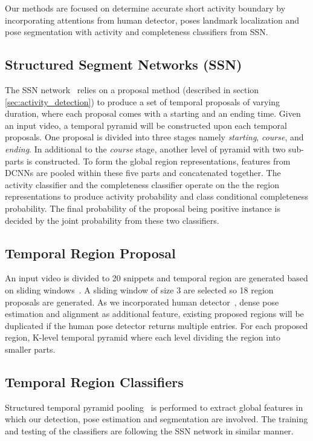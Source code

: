 Our methods are focused on determine accurate short activity boundary by incorporating attentions from human detector, poses landmark localization and pose segmentation with activity and completeness classifiers from SSN. 

\subsection{Structured Segment Networks (SSN)}
The SSN network~\cite{zhao2017temporal} relies on a proposal method (described in section \ref{sec:activity_detection}) to produce a set of temporal proposals of varying duration, where each proposal comes with a starting and an ending time. Given an input video, a temporal pyramid will be constructed upon each temporal proposals. One proposal is divided into three stages namely \textit{starting}, \textit{course}, and \textit{ending}. In additional to the \textit{course} stage, another level of pyramid with two sub-parts is constructed. To form the global region representations, features from DCNNs are pooled within these five parts and concatenated together. The activity classifier and the completeness classifier operate on the the region representations to produce activity probability and class conditional completeness probability. The final probability of the proposal being positive instance is decided by the joint probability from these two classifiers.

\subsection{Temporal Region Proposal}
An input video is divided to 20 snippets and temporal region are generated based on sliding windows~\cite{shou2016temporal, yuan2016temporal}. A sliding window of size 3 are selected so 18 region proposals are generated. As we incorporated human detector~\cite{zeng2016crafting}, dense pose estimation and alignment as additional feature, existing proposed regions will be duplicated if the human pose detector returns multiple entries. For each proposed region,  K-level temporal pyramid where each level dividing the region into smaller parts.

\subsection{Temporal Region Classifiers}
Structured temporal pyramid pooling~\cite{zhao2017temporal} is performed to extract global features in which our detection, pose estimation and segmentation are involved. The training and testing of the classifiers are following the SSN network in similar manner.

